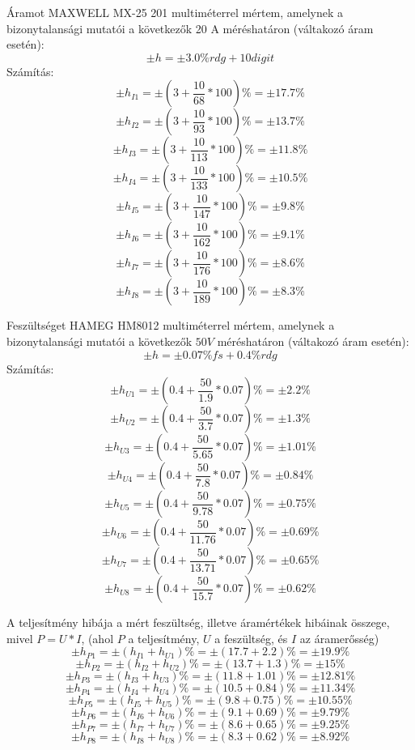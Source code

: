 \documentclass[10pt,a4paper]{article}
\begin{document}
\newpage
Áramot MAXWELL MX-25 201 multiméterrel mértem, amelynek a bizonytalansági mutatói a következők 20 A méréshatáron (váltakozó áram esetén): $$\pm h = \pm 3.0\% rdg + 10 digit$$
Számítás:
$$\pm h_{I1} = \pm \left(3 + \frac{10}{68} * 100\right) \% = \pm 17.7 \% $$
$$\pm h_{I2} = \pm \left(3 + \frac{10}{93} * 100\right) \% = \pm 13.7 \% $$
$$\pm h_{I3} = \pm \left(3 + \frac{10}{113} * 100\right) \% = \pm 11.8 \% $$
$$\pm h_{I4} = \pm \left(3 + \frac{10}{133} * 100\right) \% = \pm 10.5 \% $$
$$\pm h_{I5} = \pm \left(3 + \frac{10}{147} * 100\right) \% = \pm 9.8 \% $$
$$\pm h_{I6} = \pm \left(3 + \frac{10}{162} * 100\right) \% = \pm 9.1 \% $$
$$\pm h_{I7} = \pm \left(3 + \frac{10}{176} * 100\right) \% = \pm 8.6 \% $$
$$\pm h_{I8} = \pm \left(3 + \frac{10}{189} * 100\right) \% = \pm 8.3 \% $$

Feszültséget HAMEG HM8012 multiméterrel mértem, amelynek a bizonytalansági mutatói a következők $50 V$ méréshatáron (váltakozó áram esetén):
$$\pm h = \pm 0.07\% fs + 0.4 \% rdg$$
Számítás:
$$\pm h_{U1} = \pm \left(0.4 + \frac{50}{1.9} * 0.07\right) \% = \pm 2.2 \%$$
$$\pm h_{U2} = \pm \left(0.4 + \frac{50}{3.7} * 0.07\right) \% = \pm 1.3 \%$$
$$\pm h_{U3} = \pm \left(0.4 + \frac{50}{5.65} * 0.07\right) \% = \pm 1.01 \%$$
$$\pm h_{U4} = \pm \left(0.4 + \frac{50}{7.8} * 0.07\right) \% = \pm 0.84 \%$$
$$\pm h_{U5} = \pm \left(0.4 + \frac{50}{9.78} * 0.07\right) \% = \pm 0.75 \%$$
$$\pm h_{U6} = \pm \left(0.4 + \frac{50}{11.76} * 0.07\right) \% = \pm 0.69 \%$$
$$\pm h_{U7} = \pm \left(0.4 + \frac{50}{13.71} * 0.07\right) \% = \pm 0.65 \%$$
$$\pm h_{U8} = \pm \left(0.4 + \frac{50}{15.7} * 0.07\right) \% = \pm 0.62 \%$$

A teljesítmény hibája a mért feszültség, illetve áramértékek hibáinak összege, mivel $P = U * I$,
(ahol $P$ a teljesítmény, $U$ a feszültség, és $I$ az áramerősség)
$$\pm h_{P1} = \pm \left(h_{I1} + h_{U1}\right) \% = \pm \left(17.7 + 2.2\right) \% = \pm 19.9 \%$$
$$\pm h_{P2} = \pm \left(h_{I2} + h_{U2}\right) \% = \pm \left(13.7 + 1.3\right) \% = \pm 15 \%$$
$$\pm h_{P3} = \pm \left(h_{I3} + h_{U3}\right) \% = \pm \left(11.8 + 1.01\right) \% = \pm 12.81 \%$$
$$\pm h_{P4} = \pm \left(h_{I4} + h_{U4}\right) \% = \pm \left(10.5 + 0.84\right) \% = \pm 11.34 \%$$
$$\pm h_{P5} = \pm \left(h_{I5} + h_{U5}\right) \% = \pm \left(9.8 + 0.75\right) \% = \pm 10.55 \%$$
$$\pm h_{P6} = \pm \left(h_{I6} + h_{U6}\right) \% = \pm \left(9.1 + 0.69\right) \% = \pm 9.79 \%$$
$$\pm h_{P7} = \pm \left(h_{I7} + h_{U7}\right) \% = \pm \left(8.6 + 0.65\right) \% = \pm 9.25 \%$$
$$\pm h_{P8} = \pm \left(h_{I8} + h_{U8}\right) \% = \pm \left(8.3 + 0.62\right) \% = \pm 8.92 \%$$
\newpage
\end{document}
